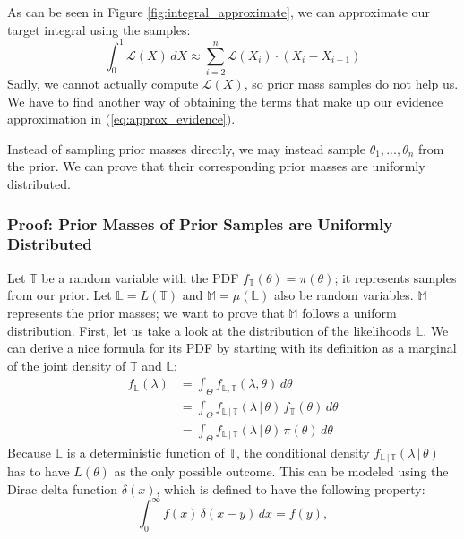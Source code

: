 \documentclass[12pt, a4paper]{report}
\begin{document}
As can be seen in Figure \ref{fig:integral_approximate}, we can approximate our target integral using the samples:
\begin{equation}
    \int_0^1 \mathcal{L}(X) \, dX \approx \sum_{i=2}^n \mathcal{L}(X_i) \cdot (X_i - X_{i-1}) \label{eq:approx_evidence}
\end{equation}
Sadly, we cannot actually compute $\mathcal{L}(X)$, so prior mass samples do not help us.
We have to find another way of obtaining the terms that make up our evidence approximation in (\ref{eq:approx_evidence}).

Instead of sampling prior masses directly, we may instead sample $\theta_1, ..., \theta_n$ from the prior.
We can prove that their corresponding prior masses are uniformly distributed.

\FloatBarrier
\subsubsection{Proof: Prior Masses of Prior Samples are Uniformly Distributed}
Let $\mathbb{T}$ be a random variable with the PDF $f_{\mathbb{T}}(\theta) = \pi(\theta)$; it represents samples from our prior.
Let $\mathbb{L} = L(\mathbb{T})$ and $\mathbb{M} = \mu(\mathbb{L})$ also be random variables.
$\mathbb{M}$ represents the prior masses; we want to prove that $\mathbb{M}$ follows a uniform distribution.
First, let us take a look at the distribution of the likelihoods $\mathbb{L}$.
We can derive a nice formula for its PDF by starting with its definition as a marginal of the joint density of $\mathbb{T}$ and $\mathbb{L}$:
\begin{align}
    f_\mathbb{L}(\lambda) &= \int_\Theta f_{\mathbb{L}, \mathbb{T}}(\lambda, \theta) \, d\theta \nonumber\\
    &= \int_\Theta f_{\mathbb{L} \,|\, \mathbb{T}}(\lambda \,|\, \theta) \, f_\mathbb{T}(\theta) \, d\theta \nonumber\\
    &= \int_\Theta f_{\mathbb{L} \,|\, \mathbb{T}}(\lambda \,|\, \theta) \, \pi(\theta) \, d\theta \label{eq:L_integral}
\end{align}
Because $\mathbb{L}$ is a deterministic function of $\mathbb{T}$, the conditional density $f_{\mathbb{L} \,|\, \mathbb{T}}(\lambda \,|\, \theta)$ has to have $L(\theta)$ as the only possible outcome.
This can be modeled using the Dirac delta function $\delta(x)$, which is defined to have the following property:
\begin{equation}
    \int_0^\infty f(x) \, \delta(x - y) \, dx = f(y), \label{eq:dirac_delta_property}
\end{equation}
\end{document}
